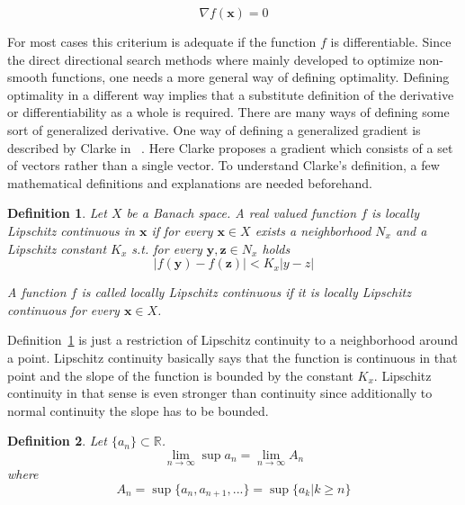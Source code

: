 \documentclass[a4paper,10pt]{article}
\newtheorem{definition}{Definition}
\renewcommand{\vec}[1]{\mathbf{#1}}
\newcommand{\defref}[1]{Definition~\ref{#1}}
\begin{document}
    \begin{equation}
        \label{equ:stationary_grad}
        \nabla f(\vec{x}) = 0
    \end{equation}

    For most cases this criterium is adequate if the function $f$ is differentiable.
    Since the direct directional search methods where mainly developed
    to optimize non-smooth functions, one needs a more general way
    of defining optimality.
    Defining optimality in a different way implies that a substitute
    definition of the derivative or differentiability as a whole
    is required.
    There are many ways of defining some sort of generalized derivative.
    One way of defining a generalized gradient is described by Clarke
    in ~\cite{clarke}.
    Here Clarke proposes a gradient which consists of a set of vectors
    rather than a single vector.
    To understand Clarke's definition, a few mathematical definitions
    and explanations are needed beforehand.
    
    \begin{definition}
        \label{def:local_lipschitz}
        Let $X$ be a Banach space.
        A real valued function $f$ is locally Lipschitz continuous in $\vec{x}$
        if for every $\vec{x} \in X$ exists a neighborhood $N_x$ and a Lipschitz
        constant $K_x$ s.t. for every $\vec{y}, \vec{z} \in N_x$ holds 
        \begin{equation}
            |f(\vec{y}) - f(\vec{z})| < K_x|y - z|
        \end{equation}

        A function $f$ is called locally Lipschitz continuous if it is
        locally Lipschitz continuous for every $\vec{x} \in X$.
    \end{definition}
    
    \defref{def:local_lipschitz} is just a restriction of Lipschitz continuity
    to a neighborhood around a point.
    Lipschitz continuity basically says that the function is continuous in
    that point and the slope of the function is bounded by the constant $K_x$.     
    Lipschitz continuity in that sense is even stronger than continuity
    since additionally to normal continuity the slope has to be bounded.

    \begin{definition}
        Let $\{a_n\} \subset \mathbb{R}$.
        \begin{equation}
            \lim_{n \rightarrow \infty} \sup a_n = \lim_{n \rightarrow \infty} A_n
        \end{equation} 
        where
        \begin{equation}
            A_n = \sup\{a_n, a_{n+1}, ...\} = \sup\{a_k | k \geq n\}
        \end{equation}
    \end{definition}
\end{document}
